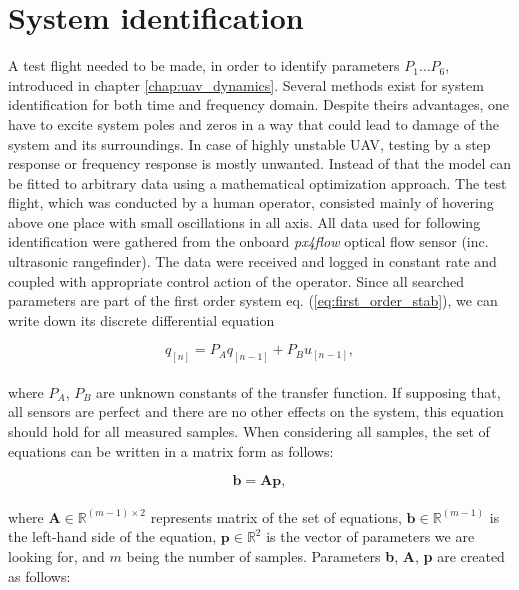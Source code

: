 \section{System identification}
\label{cap:system_identification}

A test flight needed to be made, in order to identify parameters $P_1 \hdots P_6$, introduced in chapter \ref{chap:uav_dynamics}. Several methods exist for system identification for both time and frequency domain. Despite theirs advantages, one have to excite system poles and zeros in a way that could lead to damage of the system and its surroundings. In case of highly unstable UAV, testing by a step response or frequency response is mostly unwanted. Instead of that the model can be fitted to arbitrary data using a mathematical optimization approach. The test flight, which was conducted by a human operator, consisted mainly of hovering above one place with small oscillations in all axis. All data used for following identification were gathered from the onboard \emph{px4flow} optical flow sensor (inc. ultrasonic rangefinder). The data were received and logged in constant rate and coupled with appropriate control action of the operator. Since all searched parameters are part of the first order system eq. (\ref{eq:first_order_stab}), we can write down its discrete differential equation

\begin{equation}
q_{[n]} = P_Aq_{[n-1]} + P_Bu_{[n-1]},
\end{equation}
\\
where $P_A$, $P_B$ are unknown constants of the transfer function. If supposing that, all sensors are perfect and there are no other effects on the system, this equation should hold for all measured samples. When considering all samples, the set of equations can be written in a matrix form as follows:

\begin{equation}
\textbf{b} = \textbf{A}\textbf{p},
\label{eq:bap}
\end{equation}
\\
where $\textbf{A} \in \mathbb{R}^{(m-1)\times2}$ represents matrix of the set of equations, $\textbf{b} \in \mathbb{R}^{(m-1)}$ is the left-hand side of the equation, $\textbf{p} \in \mathbb{R}^{2}$ is the vector of parameters we are looking for, and $m$ being the number of samples. Parameters \textbf{b}, \textbf{A}, \textbf{p} are created as follows:

